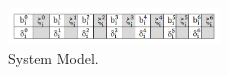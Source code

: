 \begin{figure}[h!]
\begin{center}
\includegraphics[width=0.5\textwidth]{system_model.png}
\caption{System Model.}
\label{fig:system_model}
\end{center}
\vspace{-10pt}
\end{figure}
%

